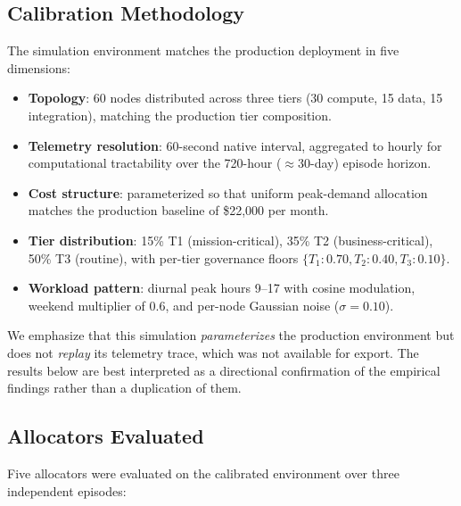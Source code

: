 \documentclass[runningheads]{llncs}
\begin{document}
\subsection{Calibration Methodology}

The simulation environment matches the production deployment in five dimensions:
\begin{itemize}
\item \textbf{Topology}: 60 nodes distributed across three tiers (30 compute, 15 data, 15 integration), matching the production tier composition.
\item \textbf{Telemetry resolution}: 60-second native interval, aggregated to hourly for computational tractability over the 720-hour ($\approx$30-day) episode horizon.
\item \textbf{Cost structure}: parameterized so that uniform peak-demand allocation matches the production baseline of \$22{,}000 per month.
\item \textbf{Tier distribution}: 15\% T1 (mission-critical), 35\% T2 (business-critical), 50\% T3 (routine), with per-tier governance floors $\{T_1: 0.70, T_2: 0.40, T_3: 0.10\}$.
\item \textbf{Workload pattern}: diurnal peak hours 9--17 with cosine modulation, weekend multiplier of 0.6, and per-node Gaussian noise ($\sigma = 0.10$).
\end{itemize}

We emphasize that this simulation \emph{parameterizes} the production environment but does not \emph{replay} its telemetry trace, which was not available for export. The results below are best interpreted as a directional confirmation of the empirical findings rather than a duplication of them.

\subsection{Allocators Evaluated}

Five allocators were evaluated on the calibrated environment over three independent episodes:
\end{document}
